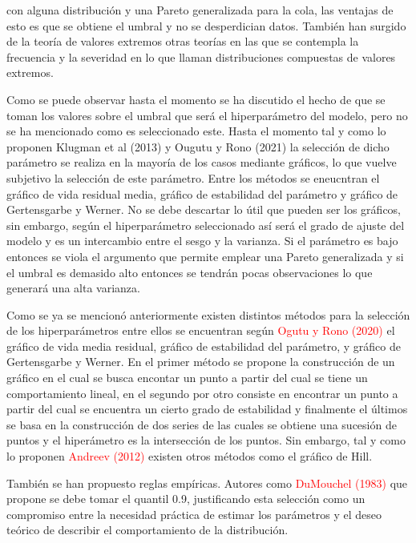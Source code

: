 con alguna distribuci\'on y una Pareto generalizada para la cola, las ventajas de esto es que 
se obtiene el umbral y no se desperdician datos. Tambi\'en han surgido de la teor\'ia de valores
extremos otras teor\'ias en las que se contempla la frecuencia y la severidad en lo que llaman 
distribuciones compuestas de valores extremos. 
\par Como se puede observar hasta el momento se ha discutido el hecho de que se toman los valores
sobre el umbral que ser\'a el hiperpar\'ametro del modelo, pero no se ha mencionado como es seleccionado este. Hasta el momento tal y como 
lo proponen Klugman et al (2013) y  Ougutu y Rono (2021) la selecci\'on de dicho par\'ametro se
realiza en la mayor\'ia de los casos mediante gr\'aficos, lo que vuelve subjetivo la selecci\'on 
de este par\'ametro. Entre los m\'etodos se eneucntran el gr\'afico de vida residual media, gr\'afico
de estabilidad del par\'ametro y gr\'afico de Gertensgarbe y Werner. No se debe descartar lo \'util 
que pueden ser los gr\'aficos, sin embargo, seg\'un el hiperpar\'ametro seleccionado as\'i ser\'a el
grado de ajuste del modelo y es un intercambio entre el sesgo y la varianza. Si el par\'ametro 
es bajo entonces se viola el argumento que permite emplear una Pareto generalizada y si el umbral es 
demasido alto entonces se tendr\'an pocas observaciones lo que generar\'a una alta varianza.


\par Como se ya se mencion\'o anteriormente existen distintos m\'etodos para la selecci\'on de los
hiperpar\'ametros entre ellos se encuentran seg\'un \textcolor{red}{Ogutu y Rono (2020)} 
el gr\'afico de vida media residual, gr\'afico de estabilidad del par\'ametro, y gr\'afico
de Gertensgarbe y Werner. En el primer m\'etodo se propone la construcci\'on de un gr\'afico
en el cual se busca encontar un punto a partir del cual se tiene un comportamiento lineal,
en el segundo por otro consiste en encontrar un punto a partir del cual se encuentra
un cierto grado de estabilidad y finalmente el \'ultimos se basa en la construcci\'on de dos
series de las cuales se obtiene una sucesi\'on de puntos y el hiper\'ametro es la intersecci\'on
de los puntos. Sin embargo, tal y como lo proponen \textcolor{red}{Andreev (2012)} existen otros 
m\'etodos como el gr\'afico de Hill. 

\par Tambi\'en se han propuesto reglas emp\'iricas. Autores como \textcolor{red}{DuMouchel (1983)} que propone se debe tomar el quantil
0.9, justificando esta selecci\'on como un compromiso entre la necesidad pr\'actica de estimar
los par\'ametros y el deseo te\'orico de describir el comportamiento de la distribuci\'on.

